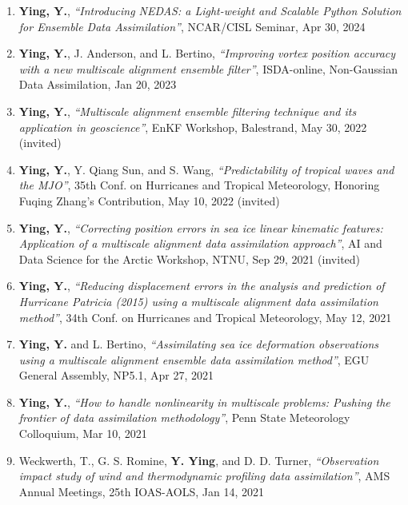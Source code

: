 \begin{enumerate}
\item \textbf{Ying, Y.},
\textit{``Introducing NEDAS: a Light-weight and Scalable Python Solution for Ensemble Data Assimilation''},
NCAR/CISL Seminar, Apr 30, 2024

\item \textbf{Ying, Y.}, J. Anderson, and L. Bertino,
\textit{``Improving vortex position accuracy with a new multiscale alignment ensemble filter''},
ISDA-online, Non-Gaussian Data Assimilation, Jan 20, 2023

\item \textbf{Ying, Y.},
\textit{``Multiscale alignment ensemble filtering technique and its application in geoscience''},
EnKF Workshop, Balestrand, May 30, 2022
(invited)

\item \textbf{Ying, Y.}, Y. Qiang Sun, and S. Wang,
\textit{``Predictability of tropical waves and the MJO''},
35th Conf. on Hurricanes and Tropical Meteorology, Honoring Fuqing Zhang’s Contribution, May 10, 2022
(invited)

\item \textbf{Ying, Y.},
\textit{``Correcting position errors in sea ice linear kinematic features: Application of a multiscale alignment data assimilation approach''},
AI and Data Science for the Arctic Workshop, NTNU, Sep 29, 2021
(invited)

\item \textbf{Ying, Y.},
\textit{``Reducing displacement errors in the analysis and prediction of Hurricane Patricia (2015) using a multiscale alignment data assimilation method''},
34th Conf. on Hurricanes and Tropical Meteorology, May 12, 2021

\item \textbf{Ying, Y.} and L. Bertino,
\textit{``Assimilating sea ice deformation observations using a multiscale alignment ensemble data assimilation method''},
EGU General Assembly, NP5.1, Apr 27, 2021

\item \textbf{Ying, Y.},
\textit{``How to handle nonlinearity in multiscale problems: Pushing the frontier of data assimilation methodology''},
Penn State Meteorology Colloquium, Mar 10, 2021

\item Weckwerth, T., G. S. Romine, \textbf{Y. Ying}, and D. D. Turner,
\textit{``Observation impact study of wind and thermodynamic profiling data assimilation''},
AMS Annual Meetings, 25th IOAS-AOLS, Jan 14, 2021


\end{enumerate}
